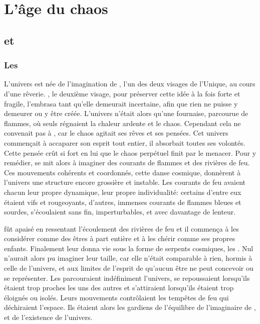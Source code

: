 \chapter{L'âge du chaos}


\section{\Mey et \Cind}


\subsection{Les \SC}

L'univers est née de l'imagination de \Mey, l'un des deux visages de l'Unique, au cours d'une rêverie. \Cind, le deuxième visage, pour préserver cette idée à la fois forte et fragile, l'embrasa tant qu'elle demeurait incertaine, afin que rien ne puisse y demeurer ou y être créée. L'univers n'était alors qu'une fournaise, parcourue de flammes, où seuls régnaient la chaleur ardente et le chaos. Cependant cela ne convenait pas à \Mey, car le chaos agitait ses rêves et ses pensées. Cet univers commençait à accaparer son esprit tout entier, il absorbait toutes ses volontés. Cette pensée crût si fort en lui que le chaos perpétuel finit par le menacer. Pour y remédier, \Cind se mit alors à imaginer des courants de flammes et des rivières de feu. Ces mouvements cohérents et coordonnés, cette danse cosmique, donnèrent à l'univers une structure encore grossière et instable. Les courants de feu avaient chacun leur propre dynamique, leur propre individualité: certains d'entre eux étaient vifs et rougeoyants, d'autres, immenses courants de flammes bleues et sourdes, s'écoulaient sans fin, imperturbables, et avec davantage de lenteur.

\Mey fût apaisé en ressentant l'écoulement des rivières de feu et il commença à les considérer comme des êtres à part entière et à les chérir comme ses propres enfants. Finalement \Mey leur donna vie sous la forme de serpents cosmiques, les \SC. Nul n'aurait alors pu imaginer leur taille, car elle n'était comparable à rien, hormis à celle de l'univers, et aux limites de l'esprit de \Mey qu'aucun être ne peut concevoir ou se représenter. Les \SC parcouraient indéfiniment l'univers, se repoussaient lorsqu'ils étaient trop proches les uns des autres et s'attiraient lorsqu'ils étaient trop éloignés ou isolés. Leurs mouvements contrôlaient les tempêtes de feu qui déchiraient l'espace. Ils étaient alors les gardiens de l'équilibre de l'imaginaire de \Mey, et de l'existence de l'univers.

